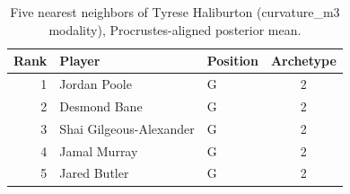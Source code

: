 \begin{table}[htbp]
  \centering\small
  \begin{tabular}{rllc}
    \toprule
    Rank & Player & Position & Archetype \\
    \midrule
    1 & Jordan Poole & G & 2 \\
    2 & Desmond Bane & G & 2 \\
    3 & Shai Gilgeous-Alexander & G & 2 \\
    4 & Jamal Murray & G & 2 \\
    5 & Jared Butler & G & 2 \\
    \bottomrule
  \end{tabular}
  \caption{Five nearest neighbors of Tyrese Haliburton (curvature_m3 modality), Procrustes-aligned posterior mean.}
  \label{tab:Tyrese_Haliburton_neighbors_curvature_m3}
\end{table}

